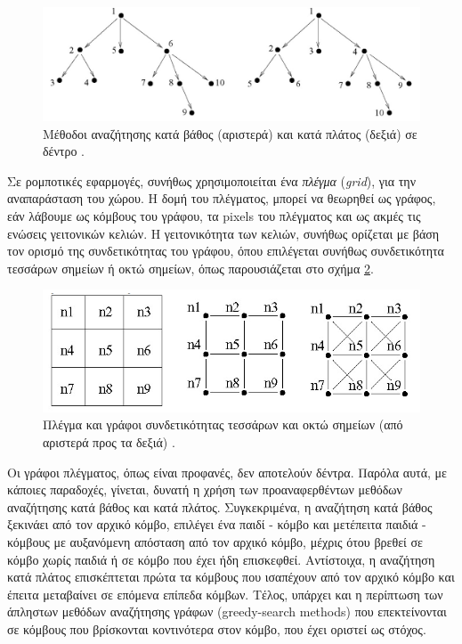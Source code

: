 \begin{figure}[!ht]
	\centering
	\includegraphics[width=0.6\linewidth]{Chapters/Chapter3/Figures/tree_search_methods.png}
	\caption[Μέθοδοι αναζήτησης κατά βάθος (αριστερά) και κατά πλάτος (δεξιά) σε δέντρο.]{Μέθοδοι αναζήτησης κατά βάθος (αριστερά) και κατά πλάτος (δεξιά) σε δέντρο \cite{principles_of_robot_motion}.}
	\label{fig:tree_search_methods}
\end{figure}

\bigskip
Σε ρομποτικές εφαρμογές, συνήθως χρησιμοποιείται ένα \textit{πλέγμα} (\textit{grid}), για την αναπαράσταση του χώρου. Η δομή του πλέγματος, μπορεί να θεωρηθεί ως γράφος, εάν λάβουμε ως κόμβους του γράφου, τα pixels του πλέγματος και ως ακμές τις ενώσεις γειτονικών κελιών. Η γειτονικότητα των κελιών, συνήθως ορίζεται με βάση τον ορισμό της συνδετικότητας του γράφου, όπου επιλέγεται συνήθως συνδετικότητα τεσσάρων σημείων ή οκτώ σημείων, όπως παρουσιάζεται στο σχήμα \ref{fig:graph_connectivity}.

\begin{figure}[!ht]
	\centering
	\includegraphics[width=0.5\linewidth]{Chapters/Chapter3/Figures/graph_connectivity.png}
	\caption[Πλέγμα και γράφοι συνδετικότητας τεσσάρων και οκτώ σημείων (από αριστερά προς τα δεξιά).]{Πλέγμα και γράφοι συνδετικότητας τεσσάρων και οκτώ σημείων (από αριστερά προς τα δεξιά) \cite{principles_of_robot_motion}.}
	\label{fig:graph_connectivity}
\end{figure}

\bigskip
Οι γράφοι πλέγματος, όπως είναι προφανές, δεν αποτελούν δέντρα. Παρόλα αυτά, με κάποιες παραδοχές, γίνεται, δυνατή η χρήση των προαναφερθέντων μεθόδων αναζήτησης κατά βάθος και κατά πλάτος. Συγκεκριμένα, η αναζήτηση κατά βάθος ξεκινάει από τον αρχικό κόμβο, επιλέγει ένα παιδί - κόμβο και μετέπειτα παιδιά - κόμβους με αυξανόμενη απόσταση από τον αρχικό κόμβο, μέχρις ότου βρεθεί σε κόμβο χωρίς παιδιά ή σε κόμβο που έχει ήδη επισκεφθεί. Αντίστοιχα, η αναζήτηση κατά πλάτος επισκέπτεται πρώτα τα κόμβους που ισαπέχουν από τον αρχικό κόμβο και έπειτα μεταβαίνει σε επόμενα επίπεδα κόμβων. Τέλος, υπάρχει και η περίπτωση των άπληστων μεθόδων αναζήτησης γράφων (greedy-search methods) που επεκτείνονται σε κόμβους που βρίσκονται κοντινότερα στον κόμβο, που έχει οριστεί ως στόχος. 


